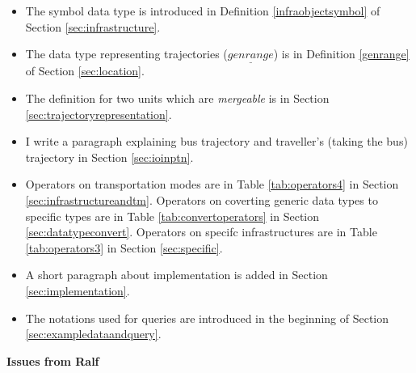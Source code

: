 \newpage 

\begin{itemize}
 \item The symbol data type is introduced in Definition \ref{infraobjectsymbol} of Section \ref{sec:infrastructure}. 
 \item The data type representing trajectories ($\underline{genrange}$) is in Definition \ref{genrange} of Section \ref{sec:location}. 
 \item The definition for two units which are \textit{mergeable} is in Section \ref{sec:trajectoryrepresentation}.  
 \item I write a paragraph explaining bus trajectory and traveller's (taking the bus) trajectory in Section \ref{sec:ioinptn}. 
 \item Operators on transportation modes are in Table \ref{tab:operators4} in Section \ref{sec:infrastructureandtm}. Operators on coverting generic data types to specific types are in Table \ref{tab:convertoperators} in Section \ref{sec:datatypeconvert}. Operators on specifc infrastructures are in Table \ref{tab:operators3} in Section \ref{sec:specific}. 

  \item A short paragraph about implementation is added in Section \ref{sec:implementation}.
 \item The notations used for queries are introduced in the beginning of Section \ref{sec:exampledataandquery}.
\end{itemize}


\textbf{Issues from Ralf} 

